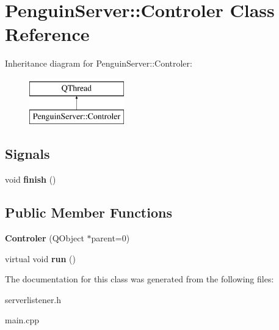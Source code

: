 \hypertarget{classPenguinServer_1_1Controler}{\section{Penguin\-Server\-:\-:Controler Class Reference}
\label{classPenguinServer_1_1Controler}
}
Inheritance diagram for Penguin\-Server\-:\-:Controler\-:\begin{figure}[H]
\begin{center}
\leavevmode
\includegraphics[height=2.000000cm]{classPenguinServer_1_1Controler}
\end{center}
\end{figure}
\subsection*{Signals}
\begin{DoxyCompactItemize}
\item 
\hypertarget{classPenguinServer_1_1Controler_a9d688185332790c948fc25bdf1da96a6}{void {\bfseries finish} ()}\label{classPenguinServer_1_1Controler_a9d688185332790c948fc25bdf1da96a6}

\end{DoxyCompactItemize}
\subsection*{Public Member Functions}
\begin{DoxyCompactItemize}
\item 
\hypertarget{classPenguinServer_1_1Controler_a553892788a017f926fc4669ff5062612}{{\bfseries Controler} (Q\-Object $\ast$parent=0)}\label{classPenguinServer_1_1Controler_a553892788a017f926fc4669ff5062612}

\item 
\hypertarget{classPenguinServer_1_1Controler_a25d46a60f87ec8a30ba7a447bc52f12a}{virtual void {\bfseries run} ()}\label{classPenguinServer_1_1Controler_a25d46a60f87ec8a30ba7a447bc52f12a}

\end{DoxyCompactItemize}


The documentation for this class was generated from the following files\-:\begin{DoxyCompactItemize}
\item 
serverlistener.\-h\item 
main.\-cpp\end{DoxyCompactItemize}
